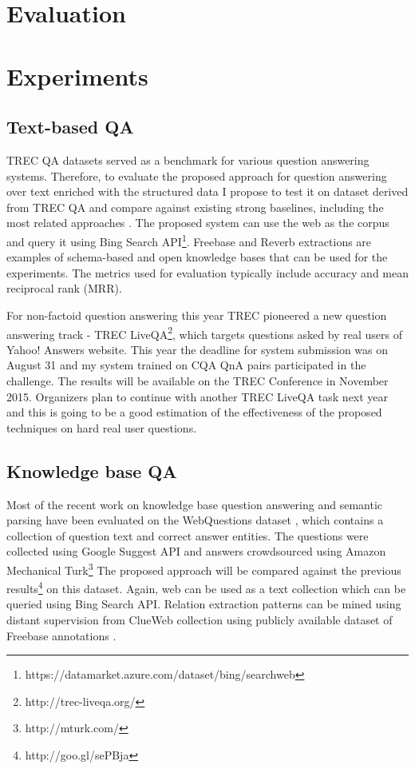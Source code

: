 \section{Evaluation}

\section{Experiments}

\subsection{Text-based QA}

TREC QA datasets served as a benchmark for various question answering systems.
Therefore, to evaluate the proposed approach for question answering over text enriched with the structured data I propose to test it on dataset derived from TREC QA and compare against existing strong baselines, including the most related approaches \cite{Fader:2014:OQA:2623330.2623677,Sun:2015:ODQ:2736277.2741651}.
The proposed system can use the web as the corpus and query it using Bing Search API\footnote{https://datamarket.azure.com/dataset/bing/searchweb}.
Freebase and Reverb extractions \cite{FaderSE11} are examples of schema-based and open knowledge bases that can be used for the experiments.
The metrics used for evaluation typically include accuracy and mean reciprocal rank (MRR).

For non-factoid question answering this year TREC pioneered a new question answering track - TREC LiveQA\footnote{http://trec-liveqa.org/}, which targets questions asked by real users of Yahoo! Answers website.
This year the deadline for system submission was on August 31 and my system trained on CQA QnA pairs participated in the challenge.
The results will be available on the TREC Conference in November 2015.
Organizers plan to continue with another TREC LiveQA task next year and this is going to be a good estimation of the effectiveness of the proposed techniques on hard real user questions.

\subsection{Knowledge base QA}

Most of the recent work on knowledge base question answering and semantic parsing have been evaluated on the WebQuestions dataset \cite{BerantCFL13:sempre}, which contains a collection of question text and correct answer entities.
The questions were collected using Google Suggest API and answers crowdsourced using Amazon Mechanical Turk\footnote{http://mturk.com/}
The proposed approach will be compared against the previous results\footnote{http://goo.gl/sePBja} on this dataset.
Again, web can be used as a text collection which can be queried using Bing Search API.
Relation extraction patterns can be mined using distant supervision from ClueWeb collection using publicly available dataset of Freebase annotations \cite{gabrilovich2013facc1}.

